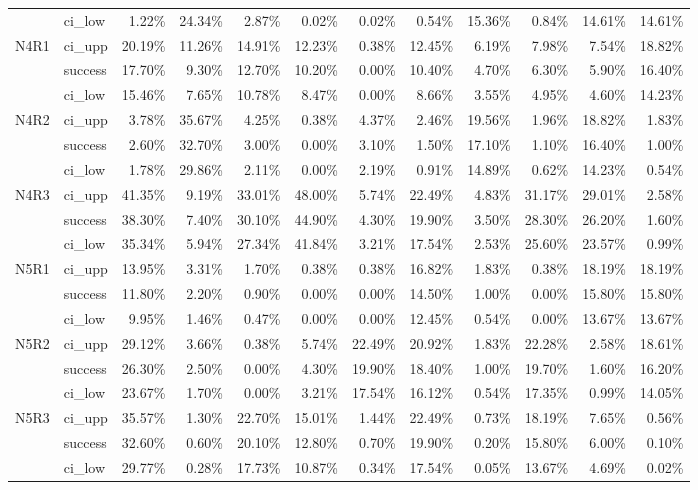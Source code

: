 \begin{tabular}{llrrrrrrrrrr}
     & ci\_low &       1.22\% & 24.34\% &  2.87\% &  0.02\% &  0.02\% &        0.54\% & 15.36\% &  0.84\% & 14.61\% & 14.61\% \\
N4R1 & ci\_upp &      20.19\% & 11.26\% & 14.91\% & 12.23\% &  0.38\% &       12.45\% &  6.19\% &  7.98\% &  7.54\% & 18.82\% \\
     & success &      17.70\% &  9.30\% & 12.70\% & 10.20\% &  0.00\% &       10.40\% &  4.70\% &  6.30\% &  5.90\% & 16.40\% \\
     & ci\_low &      15.46\% &  7.65\% & 10.78\% &  8.47\% &  0.00\% &        8.66\% &  3.55\% &  4.95\% &  4.60\% & 14.23\% \\
N4R2 & ci\_upp &       3.78\% & 35.67\% &  4.25\% &  0.38\% &  4.37\% &        2.46\% & 19.56\% &  1.96\% & 18.82\% &  1.83\% \\
     & success &       2.60\% & 32.70\% &  3.00\% &  0.00\% &  3.10\% &        1.50\% & 17.10\% &  1.10\% & 16.40\% &  1.00\% \\
     & ci\_low &       1.78\% & 29.86\% &  2.11\% &  0.00\% &  2.19\% &        0.91\% & 14.89\% &  0.62\% & 14.23\% &  0.54\% \\
N4R3 & ci\_upp &      41.35\% &  9.19\% & 33.01\% & 48.00\% &  5.74\% &       22.49\% &  4.83\% & 31.17\% & 29.01\% &  2.58\% \\
     & success &      38.30\% &  7.40\% & 30.10\% & 44.90\% &  4.30\% &       19.90\% &  3.50\% & 28.30\% & 26.20\% &  1.60\% \\
     & ci\_low &      35.34\% &  5.94\% & 27.34\% & 41.84\% &  3.21\% &       17.54\% &  2.53\% & 25.60\% & 23.57\% &  0.99\% \\
N5R1 & ci\_upp &      13.95\% &  3.31\% &  1.70\% &  0.38\% &  0.38\% &       16.82\% &  1.83\% &  0.38\% & 18.19\% & 18.19\% \\
     & success &      11.80\% &  2.20\% &  0.90\% &  0.00\% &  0.00\% &       14.50\% &  1.00\% &  0.00\% & 15.80\% & 15.80\% \\
     & ci\_low &       9.95\% &  1.46\% &  0.47\% &  0.00\% &  0.00\% &       12.45\% &  0.54\% &  0.00\% & 13.67\% & 13.67\% \\
N5R2 & ci\_upp &      29.12\% &  3.66\% &  0.38\% &  5.74\% & 22.49\% &       20.92\% &  1.83\% & 22.28\% &  2.58\% & 18.61\% \\
     & success &      26.30\% &  2.50\% &  0.00\% &  4.30\% & 19.90\% &       18.40\% &  1.00\% & 19.70\% &  1.60\% & 16.20\% \\
     & ci\_low &      23.67\% &  1.70\% &  0.00\% &  3.21\% & 17.54\% &       16.12\% &  0.54\% & 17.35\% &  0.99\% & 14.05\% \\
N5R3 & ci\_upp &      35.57\% &  1.30\% & 22.70\% & 15.01\% &  1.44\% &       22.49\% &  0.73\% & 18.19\% &  7.65\% &  0.56\% \\
     & success &      32.60\% &  0.60\% & 20.10\% & 12.80\% &  0.70\% &       19.90\% &  0.20\% & 15.80\% &  6.00\% &  0.10\% \\
     & ci\_low &      29.77\% &  0.28\% & 17.73\% & 10.87\% &  0.34\% &       17.54\% &  0.05\% & 13.67\% &  4.69\% &  0.02\% \\
\bottomrule
\end{tabular}

